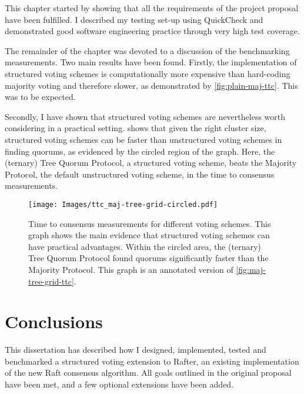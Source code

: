 \documentclass[12pt,chapterprefix=true,toc=bibliography,numbers=noendperiod,
               footnotes=multiple,twoside]{scrreprt}
\begin{document}
This chapter started by showing that all the requirements of the project proposal have been fulfilled. I described my testing set-up using QuickCheck and demonstrated good software engineering practice through very high test coverage.

The remainder of the chapter was devoted to a discussion of the benchmarking measurements. Two main results have been found. Firstly, the implementation of structured voting schemes is computationally more expensive than hard-coding majority voting and therefore slower, as demonstrated by \cref{fig:plain-maj-ttc}. This was to be expected.

Secondly, I have shown that structured voting schemes are nevertheless worth considering in a practical setting.  shows that given the right cluster size, structured voting schemes can be faster than unstructured voting schemes in finding quorums, as evidenced by the circled region of the graph. Here, the (ternary) Tree Quorum Protocol, a structured voting scheme, beats the Majority Protocol, the default unstructured voting scheme, in the time to consensus measurements.

\begin{figure}
    \centering
    \texttt{[image: Images/ttc\_maj-tree-grid-circled.pdf]}
    \caption{Time to consensus measurements for different voting schemes. This graph shows the main evidence that structured voting schemes can have practical advantages. Within the circled area, the (ternary) Tree Quorum Protocol found quorums significantly faster than the Majority Protocol. This graph is an annotated version of \cref{fig:maj-tree-grid-ttc}.}
    \label{fig:maj-tree-grid-ttc-circled}
\end{figure}



\chapter{Conclusions}
\label{ch:conclusions}


This dissertation has described how I designed, implemented, tested and benchmarked a structured voting extension to Rafter, an existing implementation of the new Raft consensus algorithm. All goals outlined in the original proposal have been met, and a few optional extensions have been added.
\end{document}
